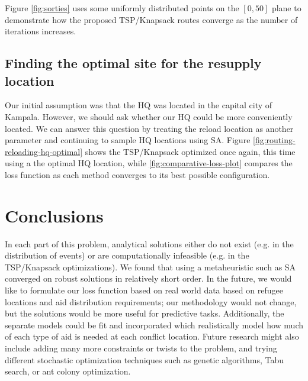 \documentclass{article} %
\begin{document}
Figure \ref{fig:sorties} uses some uniformly distributed points on the $[0,50]$ plane to demonstrate how the proposed TSP/Knapsack routes converge as the number of iterations increases.


\subsection{Finding the optimal site for the resupply location}

Our initial assumption was that the HQ was located in the capital city of Kampala. However, we should ask whether our HQ could be more conveniently located. We can answer this question by treating the reload location as another parameter and continuing to sample HQ locations using SA. Figure \ref{fig:routing-reloading-hq-optimal} shows the TSP/Knapsack optimized once again, this time using a the optimal HQ location, while \ref{fig:comparative-loss-plot} compares the loss function as each method converges to its best possible configuration.

\section*{Conclusions}

In each part of this problem, analytical solutions either do not exist (e.g. in the distribution of events) or are computationally infeasible (e.g. in the TSP/Knapsack optimizations).  We found that using a metaheuristic such as SA converged on robust solutions in relatively short order. In the future, we would like to formulate our loss function based on real world data based on refugee locations and aid distribution requirements; our methodology would not change, but the solutions would be more useful for predictive tasks. Additionally, the separate models could be fit and incorporated which realistically model how much of each type of aid is needed at each conflict location. Future research might also include adding many more constraints or twists to the problem, and trying different stochastic optimization techniques such as genetic algorithms, Tabu search, or ant colony optimization.


\end{document}
